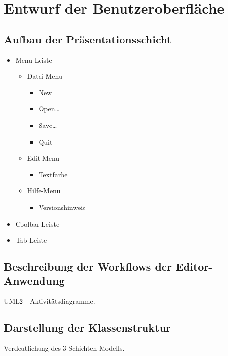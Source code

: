 \section{Entwurf der Benutzeroberfläche}

\subsection{Aufbau der Präsentationsschicht}

\begin{itemize}
\item Menu-Leiste
    \begin{itemize}
        \item Datei-Menu
        \begin{itemize}
            \item New
            \item Open\dots
            \item Save\dots
            \item Quit        
        \end{itemize}
        \item Edit-Menu
        \begin{itemize}
            \item Textfarbe
        \end{itemize}
        \item Hilfe-Menu
        \begin{itemize}
            \item Versionshinweis        
        \end{itemize}
    \end{itemize}
\item Coolbar-Leiste
\item Tab-Leiste
\end{itemize}



\subsection{Beschreibung der Workflows der Editor-Anwendung}
UML2 - Aktivitätsdiagramme.

\subsection{Darstellung der Klassenstruktur}
Verdeutlichung des 3-Schichten-Modells.